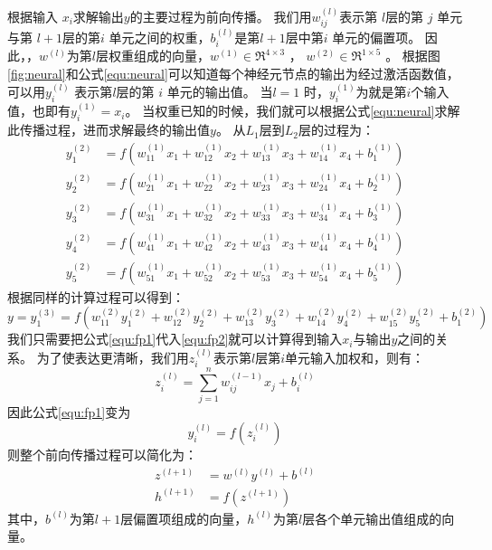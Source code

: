 根据输入 $x_i$求解输出$y$的主要过程为前向传播。
我们用$ w^{(l)}_{ij}$表示第 $ l $层的第 $ j$ 单元与第 $ l+1 $层的第$  i$ 单元之间的权重，$ b^{(l)}_i $是第$  l+1 $层中第$  i$ 单元的偏置项。
因此，，$w^{(l)}$为第$l$层权重组成的向量，$ w^{(1)} \in \Re^{4\times 3}$ ， $ w^{(2)} \in \Re^{1\times 5}$ 。
根据图\ref{fig:neural}和公式\ref{equ:neural}可以知道每个神经元节点的输出为经过激活函数值，可以用$ y^{(l)}_i$ 表示第$  l $层的第 $ i$ 单元的输出值。
当$  l=1$ 时，$  y^{(1)}_i$为就是第$  i $个输入值，也即有$  y^{(1)}_i = x_i $。
当权重已知的时候，我们就可以根据公式\ref{equ:neural}求解此传播过程，进而求解最终的输出值$y$。
从$L_1$层到$L_2$层的过程为：
\begin{align}
  y_1^{(2)} &= f(w_{11}^{(1)}x_1 + w_{12}^{(1)} x_2 + w_{13}^{(1)} x_3 + w_{14}^{(1)} x_4 + b_1^{(1)})  \\
  y_2^{(2)} &= f(w_{21}^{(1)}x_1 + w_{22}^{(1)} x_2 + w_{23}^{(1)} x_3 + w_{24}^{(1)} x_4 + b_2^{(1)})  \\
  y_3^{(2)} &= f(w_{31}^{(1)}x_1 + w_{32}^{(1)} x_2 + w_{33}^{(1)} x_3 + w_{34}^{(1)} x_4 + b_3^{(1)})  \\
  y_4^{(2)} &= f(w_{41}^{(1)}x_1 + w_{42}^{(1)} x_2 + w_{43}^{(1)} x_3 + w_{44}^{(1)} x_4 + b_4^{(1)})  \\
  y_5^{(2)} &= f(w_{51}^{(1)}x_1 + w_{52}^{(1)} x_2 + w_{53}^{(1)} x_3 + w_{54}^{(1)} x_4 + b_5^{(1)}) 
  \label{equ:fp1}
\end{align}
根据同样的计算过程可以得到：
\begin{equation}
  y = y_1^{(3)} =  f(w_{11}^{(2)} y_1^{(2)} + w_{12}^{(2)} y_2^{(2)} + w_{13}^{(2)} y_3^{(2)} + w_{14}^{(2)} y_4^{(2)} + w_{15}^{(2)} y_5^{(2)} + b_1^{(2)}) 
  \label{equ:fp2}
\end{equation}
我们只需要把公式\ref{equ:fp1}代入\ref{equ:fp2}就可以计算得到输入$x_i$与输出$y$之间的关系。
为了使表达更清晰，我们用$ z^{(l)}_i $表示第$ l $层第$  i$单元输入加权和，则有：
\begin{equation}
  z_i^{(l)} = \sum_{j=1}^n w^{(l-1)}_{ij} x_j + b^{(l)}_i
\end{equation}
因此公式\ref{equ:fp1}变为
\begin{equation}
  y^{(l)}_i = f(z^{(l)}_i)
\end{equation}
则整个前向传播过程可以简化为：
\begin{align}
  z^{(l+1)} &= w^{(l)} y^{(l)} + b^{(l)}   \\
  h^{(l+1)} &= f(z^{(l+1)})
\end{align}
其中，$b^{(l)}$为第$l+1$层偏置项组成的向量，$h^{(l)}$为第$l$层各个单元输出值组成的向量。

